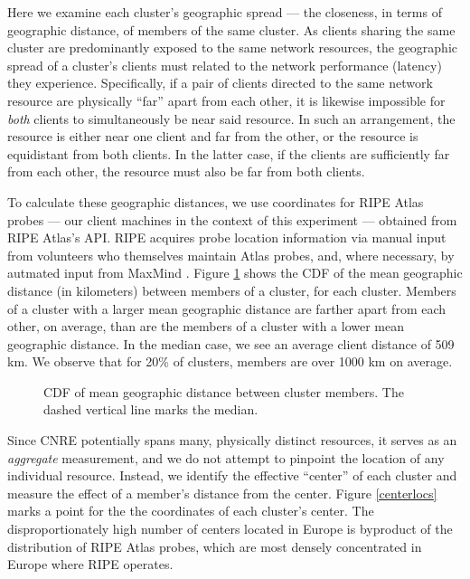 
Here we examine each cluster's geographic spread --- the closeness, in terms of
geographic distance, of members of the same cluster. As clients sharing the same
cluster are predominantly exposed to the same network resources, the geographic
spread of a cluster's clients must related to the network performance (latency)
they experience. Specifically, if a pair of clients directed
to the same network resource are physically ``far'' apart from each other, it is
likewise impossible for \emph{both} clients to simultaneously be near said
resource. In such an arrangement, the resource is either near one client and far from the other, or the
resource is equidistant from both clients. In the latter case, if the clients
are sufficiently far from each other, the resource must also be far from both clients.

To calculate these geographic distances, we use coordinates for RIPE Atlas
probes --- our client machines in the context of this experiment --- obtained
from RIPE Atlas's API. RIPE acquires probe location information via manual input
from volunteers who themselves maintain Atlas probes, and, where necessary, by
autmated input from MaxMind \cite{maxmind}. Figure \ref{geomeans} shows the CDF of the
mean geographic distance (in kilometers) between members of a cluster, for each
cluster. Members of a cluster with a larger mean geographic distance are farther
apart from each other, on average, than are the members of a cluster with a
lower mean geographic distance. In the median case, we see an average client
distance of 509 km. We observe that for 20\% of clusters, members are over 1000
km on average.  


\begin{figure}
    \caption{CDF of mean geographic distance between
    cluster members. The dashed vertical line marks the median.}
    \label{geomeans}
\end{figure}

Since CNRE potentially spans many, physically distinct resources, it serves as
an \emph{aggregate} measurement, and we do not attempt to pinpoint the location
of any individual resource. Instead, we identify the effective ``center'' of
each cluster and measure the effect of a member's distance from the center.
Figure \ref{centerlocs} marks a point for the the coordinates of each cluster's
center. The disproportionately high number of centers located in Europe is
byproduct of the distribution of RIPE Atlas probes, which are most densely
concentrated in Europe where RIPE operates. 

